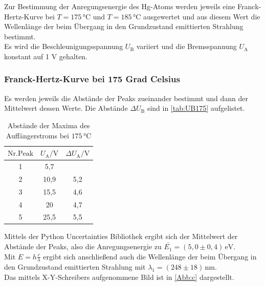 Zur Bestimmung der Anregungsenergie des Hg-Atoms werden jeweils eine Franck-Hertz-Kurve
bei $T=175 \, \si{\celsius}$ und $T=185 \, \si{\celsius}$ ausgewertet und aus diesem Wert
die Wellenlänge der beim Übergang in den Grundzustand emittierten Strahlung bestimmt.\\
Es wird die Beschleunigungsspannung $U_{\mathrm{B}}$ variiert und die Bremsspannung $U_{\mathrm{A}}$ konstant auf
1 V gehalten.

\subsubsection{Franck-Hertz-Kurve bei 175 Grad Celsius}

Es werden jeweils die Abstände der Peaks zueinander bestimmt und dann der Mittelwert
dessen Werte. Die Abstände $\Delta U_{\mathrm{B}}$ sind in \autoref{tab:UB175} aufgelistet.

\begin{table}[!h]
  \begin{center}
    \begin{tabular}{|c|c|c|}
      \hline
      $\mathrm{Nr. Peak} $ & $U_{\mathrm{A}} / \si{\volt}$ & $\Delta U_{\mathrm{A}} / \si{\volt}$ \\
      \hline
      1 & 5,7 & \\
      2 & 10,9 & 5,2 \\
      3 & 15,5 & 4,6 \\
      4 & 20   & 4,7 \\
      5 & 25,5 & 5,5 \\
      \hline
    \end{tabular}
    \caption{Abstände der Maxima des Auffängerstroms bei $175 \, \si{\celsius}$}
    \label{tab:UB175}
  \end{center}
\end{table}

Mittels der Python Uncertainties Bibliothek \cite{python} ergibt sich der Mittelwert der Abstände der Peaks, also
die Anregungsenergie zu $\bar{E_1} = (5,0 \pm 0,4) \, \si{\electronvolt}$. \\
Mit $E = h \frac{c}{\lambda}$ ergibt sich anschließend auch die Wellenlänge der beim Übergang in den
Grundzustand emittierten Strahlung mit $\lambda_1 = (248 \pm 18) \, \si{\nano\meter}$.\\
Das mittels X-Y-Schreibers aufgenommene Bild ist in \autoref{Abb:c} dargestellt.

